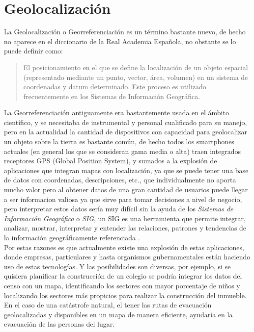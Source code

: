 \section{Geolocalización} %

  La Geolocalización o Georreferenciación es un término bastante nuevo, de hecho no aparece en el diccionario de la Real Academia Española, no obstante se lo puede definir como:

  \begin{quote}
    El posicionamiento en el que se define la localización de un objeto espacial (representado mediante un punto, vector, área, volumen) en un sistema de coordenadas y datum determinado. Este proceso es utilizado frecuentemente en los Sistemas de Información Geográfica.\cite{Georreferenciacion}
  \end{quote}


  La Georreferenciación antiguamente era bastantemente usada en el ámbito científico, y se necesitaba de instrumental y personal cualificado para su manejo, pero en la actualidad la cantidad de dispositivos con capacidad para geolocalizar un objeto sobre la tierra es bastante común, de hecho todos los smartphones actuales (en general los que se consideran gama media o alta) traen integrados receptores GPS (Global Position System), y sumados a la explosión de aplicaciones  que integran mapas con localización, ya que se puede tener una base de datos con coordenadas, descripciones, etc., que individualmente no aporta mucho valor pero al obtener datos de una gran cantidad de usuarios puede llegar a ser informacion valiosa ya que sirve para tomar decisiones a nivel de negocio, pero interpretar estos datos sería muy difícil sin la ayuda de los \emph{Sistemas de Información Geográfica} o \emph{SIG}, un SIG es una herramienta que permite integrar, analizar, mostrar, interpretar y  entender las relaciones, patrones y tendencias de la información geográficamente referenciada . \cite{what_is_gis} \\

  Por estas razones es que actualmente existe una explosión de estas aplicaciones, donde empresas, particulares y hasta organismos gubernamentales están haciendo uso de estas tecnologías.
  Y las posibilidades son diversas, por ejemplo, si se quisiera planificar la construcción de un colegio se podría integrar los datos del censo con un mapa, identificando los sectores con mayor porcentaje de niños y localizando los sectores más propicios para realizar la construcción del inmueble. En el caso de una catástrofe natural, el tener las rutas de evacuación geolocalizadas y disponibles en un mapa de manera eficiente,  ayudaría en la evacuación de las personas del lugar.\\

